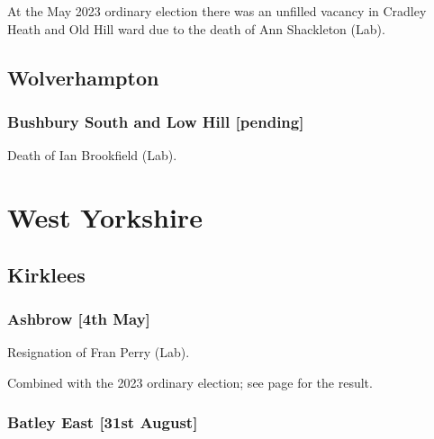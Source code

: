 \documentclass[a4paper,openany]{book}
\begin{document}
\begin{resultsiii}
At the May 2023 ordinary election there was an unfilled vacancy in Cradley Heath and Old Hill ward due to the death of Ann Shackleton (Lab).%

\subsection*{Wolverhampton}

\subsubsection*{Bushbury South and Low Hill \hspace*{\fill}\nolinebreak[1]%
	\enspace\hspace*{\fill}
	[pending]}


Death of Ian Brookfield (Lab).

\section{West Yorkshire}

\subsection*{Kirklees}

\subsubsection*{Ashbrow \hspace*{\fill}\nolinebreak[1]%
	\enspace\hspace*{\fill}
	[4th May]}


Resignation of Fran Perry (Lab).

Combined with the 2023 ordinary election; see page \pageref{KirkleesAshbrow} for the result.

\subsubsection*{Batley East \hspace*{\fill}\nolinebreak[1]%
	\enspace\hspace*{\fill}
	[31st August]}


\end{resultsiii}
\end{document}
